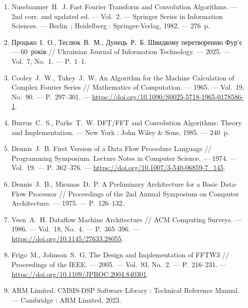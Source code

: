 \documentclass[14pt,a4paper]{extarticle}
\begin{document}
\begin{enumerate}
  \item Nussbaumer~H.~J. Fast Fourier Transform and Convolution
        Algorithms. --- 2nd corr. and updated ed. --- Vol.~2. ---
        Springer Series in Information Sciences. --- Berlin~;
        Heidelberg : Springer-Verlag, 1982. --- 276~p.

  \item Процько~І.~О., Теслюк~В.~М., Дунець~Р.~Б. Швидкому
        перетворенню Фур'є --- 60~років // Ukrainian Journal of
        Information Technology. --- 2025. --- Vol.~7, No.~1. --- P.~1--1.

  \item Cooley~J.~W., Tukey~J.~W. An Algorithm for the Machine
        Calculation of Complex Fourier Series // Mathematics of
        Computation. --- 1965. --- Vol.~19, No.~90. --- P.~297--301. ---
        \url{https://doi.org/10.1090/S0025-5718-1965-0178586-1}.

  \item Burrus~C.~S., Parks~T.~W. DFT/FFT and Convolution Algorithms:
        Theory and Implementation. --- New York : John Wiley \& Sons,
        1985. --- 240~p.

  \item Dennis~J.~B. First Version of a Data Flow Procedure Language //
        Programming Symposium. Lecture Notes in Computer Science. ---
        1974. --- Vol.~19. --- P.~362--376. ---
        \url{https://doi.org/10.1007/3-540-06859-7_145}.

  \item Dennis~J.~B., Misunas~D.~P. A Preliminary Architecture for a
        Basic Data-Flow Processor // Proceedings of the 2nd Annual
        Symposium on Computer Architecture. --- 1975. --- P.~126--132.

  \item Veen~A.~H. Dataflow Machine Architecture // ACM Computing
        Surveys. --- 1986. --- Vol.~18, No.~4. --- P.~365--396. ---
        \url{https://doi.org/10.1145/27633.28055}.

  \item Frigo~M., Johnson~S.~G. The Design and Implementation of
        FFTW3 // Proceedings of the IEEE. --- 2005. --- Vol.~93,
        No.~2. --- P.~216--231. ---
        \url{https://doi.org/10.1109/JPROC.2004.840301}.

  \item ARM Limited. CMSIS-DSP Software Library : Technical Reference
        Manual. --- Cambridge : ARM Limited, 2023.


\end{enumerate}
\end{document}

